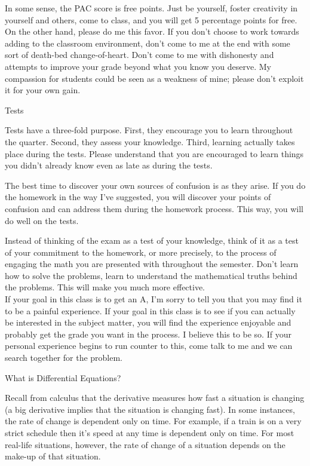 \documentclass[12pt]{letter}
\begin{document}
In some sense, the PAC score is free points.  Just be yourself, foster 
creativity in yourself and others, come to class, and you will get 5 
percentage points for free.  On the other hand, please do me this favor.  
If you don't choose to work towards adding to the classroom environment, 
don't come to me at the end with some sort of death-bed change-of-heart.  
Don't come to me with dishonesty and attempts to improve your grade beyond 
what you know you deserve.  My compassion for students could be seen as a 
weakness of mine; please don't exploit it for your own gain.

\large Tests \normalsize  

Tests have a three-fold purpose.  First, they encourage you to learn 
throughout the quarter.  Second, they assess your knowledge.  Third, 
learning actually takes place during the tests.  Please understand that 
you are encouraged to learn things you didn't already know even as late as 
during the tests.

The best time to discover your own sources of confusion is as they arise.  
If you do the homework in the way I've suggested, you will discover your 
points of confusion and can address them during the homework process.  
This way, you will do well on the tests.  

Instead of thinking of the exam as a test of your knowledge, think 
of it as a test of your commitment to the homework, or more precisely, to 
the process of engaging the math you are presented with throughout the 
semester.  Don't learn how to solve the problems, learn to understand the 
mathematical truths behind the problems.  This will make you much more 
effective.\\

If your goal in this class is to get an A, I'm sorry to tell you that you 
may find it to be a painful experience.  If your goal in this class is to 
see if you can actually be interested in the subject matter, you will find 
the experience enjoyable and probably get the grade you want in the 
process.  I believe this to be so.  If your personal experience begins to 
run counter to this, come talk to me and we can search together for the 
problem.

\newpage

\Large What is Differential Equations?\normalsize

Recall from calculus that the derivative measures how fast a situation is 
changing (a big derivative implies that the situation is changing fast).  
In some instances, the rate of change is dependent only on time.  For 
example, if a train is on a very strict schedule then it's speed at any 
time is dependent only on time.  For most real-life situations, however, 
the rate of change of a situation depends on the make-up of that 
situation.
\end{document}
